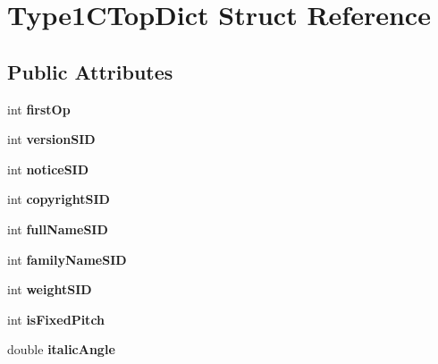\hypertarget{struct_type1_c_top_dict}{}\section{Type1\+C\+Top\+Dict Struct Reference}
\label{struct_type1_c_top_dict}
\subsection*{Public Attributes}
\begin{DoxyCompactItemize}
\item 
\mbox{\label{struct_type1_c_top_dict_a779c29198b2814715ba65f0a6ad234aa}} 
int {\bfseries first\+Op}
\item 
\mbox{\label{struct_type1_c_top_dict_aa43ea9adbf643f2d43dabf2b718b1195}} 
int {\bfseries version\+S\+ID}
\item 
\mbox{\label{struct_type1_c_top_dict_a7fe3a58ea68eb6b58aec5db520514702}} 
int {\bfseries notice\+S\+ID}
\item 
\mbox{\label{struct_type1_c_top_dict_ae3e12dbbf0d849cda419366875967d05}} 
int {\bfseries copyright\+S\+ID}
\item 
\mbox{\label{struct_type1_c_top_dict_a3edb9890b2a9cffc52b3b355c144e043}} 
int {\bfseries full\+Name\+S\+ID}
\item 
\mbox{\label{struct_type1_c_top_dict_a31884e9a93faa24a80efbc35eaf56e2c}} 
int {\bfseries family\+Name\+S\+ID}
\item 
\mbox{\label{struct_type1_c_top_dict_ab47c2b24f0ec3dee51740418b24881e9}} 
int {\bfseries weight\+S\+ID}
\item 
\mbox{\label{struct_type1_c_top_dict_abbb78ea8e4847756c870b731f7705e83}} 
int {\bfseries is\+Fixed\+Pitch}
\item 
\mbox{\label{struct_type1_c_top_dict_a321cd111889b76195ace35205e13fc10}} 
double {\bfseries italic\+Angle}

\end{DoxyCompactItemize}
